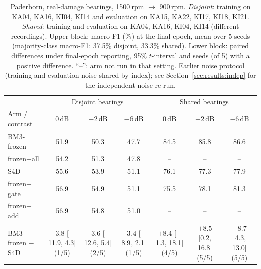 \begin{table}[htbp]
\centering
\caption{Paderborn, real-damage bearings, 1500\,rpm $\rightarrow$ 900\,rpm. \emph{Disjoint}: training on KA04, KA16, KI04, KI14 and evaluation on KA15, KA22, KI17, KI18, KI21. \emph{Shared}: training and evaluation on KA04, KA16, KI04, KI14 (different recordings). Upper block: macro-F1 (\%) at the final epoch, mean over 5 seeds (majority-class macro-F1: 37.5\% disjoint, 33.3\% shared). Lower block: paired differences under final-epoch reporting, 95\% $t$-interval and seeds (of 5) with a positive difference. ``--'': arm not run in that setting. Earlier noise protocol (training and evaluation noise shared by index); see Section~\ref{sec:results:indep} for the independent-noise re-run.}
\label{tab:pu}
\scriptsize\setlength{\tabcolsep}{2.5pt}
\begin{tabular}{@{}lcccccc@{}}
\toprule
 & \multicolumn{3}{c}{Disjoint bearings} & \multicolumn{3}{c}{Shared bearings} \\
\cmidrule(lr){2-4}\cmidrule(lr){5-7}
Arm / contrast & 0\,dB & $-2$\,dB & $-6$\,dB & 0\,dB & $-2$\,dB & $-6$\,dB \\
\midrule
BM3-frozen & 51.9 & 50.3 & 47.7 & 84.5 & 85.8 & 86.6 \\
frozen$-$all & 54.2 & 51.3 & 47.8 & -- & -- & -- \\
S4D & 55.6 & 53.9 & 51.1 & 76.1 & 77.3 & 77.9 \\
frozen$-$gate & 56.9 & 54.9 & 51.1 & 75.5 & 78.1 & 81.3 \\
frozen$+$add & 56.9 & 54.8 & 51.0 & -- & -- & -- \\
\midrule
\shortstack[l]{BM3-frozen\\ $-$ S4D} & \shortstack{$-3.8$\\ {[}$-$11.9, 4.3{]}\\ (1/5)} & \shortstack{$-3.6$\\ {[}$-$12.6, 5.4{]}\\ (2/5)} & \shortstack{$-3.4$\\ {[}$-$8.9, 2.1{]}\\ (1/5)} & \shortstack{$+8.4$\\ {[}$-$1.3, 18.1{]}\\ (4/5)} & \shortstack{$+8.5$\\ {[}0.2, 16.8{]}\\ (5/5)} & \shortstack{$+8.7$\\ {[}4.3, 13.0{]}\\ (5/5)} \\[3pt]

\end{tabular}
\end{table}
